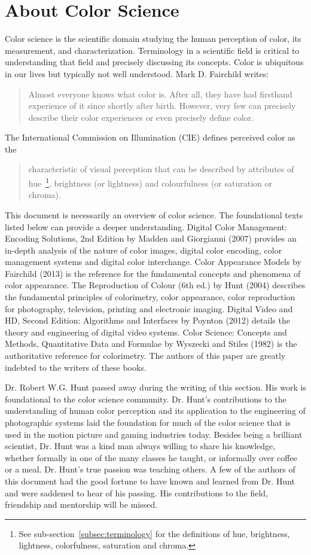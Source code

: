 \section{About Color Science}
\label{sec:about-color-science}

Color science is the scientific domain studying the human perception of color,
its measurement, and characterization. Terminology in a scientific field is
critical to understanding that field and precisely discussing its concepts.
Color is ubiquitous in our lives but typically not well understood.
\ccpar
Mark D. Fairchild writes:~\blockquote{Almost everyone knows what color is.
After all, they have had firsthand experience of it since shortly after birth.
However, very few can precisely describe their color experiences or even
precisely define color.}
\ccpar
The International Commission on Illumination (CIE) defines perceived color as
the~\blockcquote{CIEbk}{characteristic of visual perception that can be
described by attributes of hue~\footnote{See sub-section~\ref{subsec:terminology}
for the definitions of hue, brightness, lightness, colorfulness, saturation and
chroma.}, brightness (or lightness) and colourfulness (or saturation or
chroma).}
\ccpar
This document is necessarily an overview of color science. The foundational texts listed below can provide a deeper understanding.
Digital Color Management: Encoding Solutions, 2nd Edition by Madden and Giorgianni (2007) provides an in-depth analysis of the nature of color images, digital color encoding, color management systems and digital color interchange.
Color Appearance Models by Fairchild (2013) is the reference for the fundamental concepts and phenomena of color appearance.
The Reproduction of Colour (6th ed.) by Hunt (2004) describes the fundamental principles of colorimetry, color appearance, color reproduction for photography, television, printing and electronic imaging.
Digital Video and HD, Second Edition: Algorithms and Interfaces by Poynton (2012) details the theory and engineering of digital video systems.
Color Science: Concepts and Methods, Quantitative Data and Formulae by Wyszecki and Stiles (1982) is the authoritative reference for colorimetry.
The authors of this paper are greatly indebted to the writers of these books.

Dr. Robert W.G. Hunt passed away during the writing of this section. His work is foundational to the color science community. Dr. Hunt’s contributions to the understanding of human color perception and its application to the engineering of photographic systems laid the foundation for much of the color science that is used in the motion picture and gaming industries today. Besides being a brilliant scientist, Dr. Hunt was a kind man always willing to share his knowledge, whether formally in one of the many classes he taught, or informally over coffee or a meal. Dr. Hunt’s true passion was teaching others. A few of the authors of this document had the good fortune to have known and learned from Dr. Hunt and were saddened to hear of his passing. His contributions to the field, friendship and mentorship will be missed.

